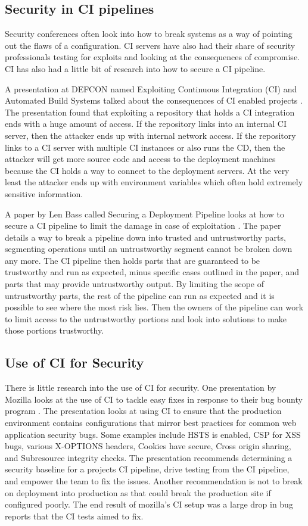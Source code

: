 \subsection{Security in CI pipelines}
	Security conferences often look into how to break systems as a way of pointing out the flaws of a configuration. CI servers have also had their share of security professionals testing for exploits
    and looking at the consequences of compromise. CI has also had a little bit of research into how to secure a CI pipeline.

	A presentation at DEFCON named Exploiting Continuous Integration (CI) and Automated Build Systems talked about the consequences of CI enabled projects \cite{spaceb0x}. The presentation found that 
    exploiting a repository that holds a CI integration ends with a huge amount of access. If the repository links into an internal CI server, then the attacker ends up with internal network access.
    If the repository links to a CI server with multiple CI instances or also runs the CD, then the attacker will get more source code and access to the deployment machines because the CI holds a 
    way to connect to the deployment servers. At the very least the attacker ends up with environment variables which often hold extremely sensitive information.

	A paper by Len Bass called Securing a Deployment Pipeline looks at how to secure a CI pipeline to limit the damage in case of exploitation \cite{Bass}. The paper details a way to break a pipeline 
    down into trusted and untrustworthy parts, segmenting operations until an untrustworthy segment cannot be broken down any more. The CI pipeline then holds parts that are guaranteed to be 
    trustworthy and run as expected, minus specific cases outlined in the paper, and parts that may provide untrustworthy output. By limiting the scope of untrustworthy parts, the rest of the pipeline
    can run as expected and it is possible to see where the most risk lies. Then the owners of the pipeline can work to limit access to the untrustworthy portions and look into solutions to make those
    portions trustworthy.

\subsection{Use of CI for Security}
    There is little research into the use of CI for security. One presentation by Mozilla looks at the use of CI to tackle easy fixes in response to their bug bounty program \cite{Vehent}. The 
    presentation looks at using CI to ensure that the production environment contains configurations that mirror best practices for common web application security bugs. Some examples include HSTS
    is enabled, CSP for XSS bugs, various X-OPTIONS headers, Cookies have secure, Cross origin sharing, and Subresource integrity checks. The presentation recommends determining a security baseline
    for a projects CI pipeline, drive testing from the CI pipeline, and empower the team to fix the issues. Another recommendation is not to break on deployment into production as that could break the
    production site if configured poorly. The end result of mozilla's CI setup was a large drop in bug reports that the CI tests aimed to fix.

